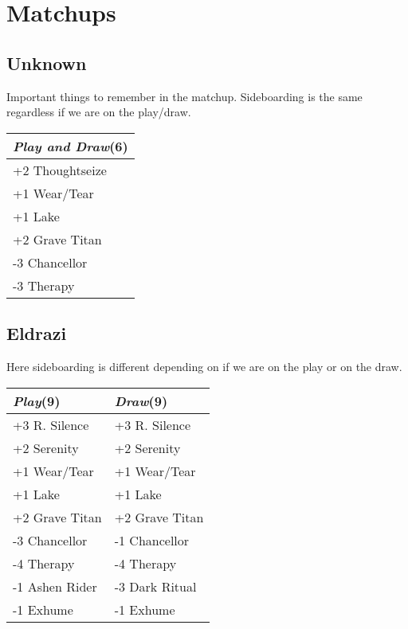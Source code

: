 \documentclass{article}
\renewcommand *\contentsname{Contents}
\begin{document}
\section*{Matchups}
\begin{multicols}{2}
\subsection*{Unknown}
Important things to remember in the matchup. Sideboarding is the same regardless if we are on the play/draw.\begin{center}
\begin{tabular}{| l |}
\hline
\textit{Play and Draw}(6) \\
\hline
\cellcolor[HTML]{BBDDBB}\small{+2 Thoughtseize}\\
\cellcolor[HTML]{BBDDBB}\small{+1 Wear/Tear}\\
\cellcolor[HTML]{BBDDBB}\small{+1 Lake}\\
\cellcolor[HTML]{BBDDBB}\small{+2 Grave Titan}\\
\cellcolor[HTML]{DDBBBB}\small{-3 Chancellor}\\
\cellcolor[HTML]{DDBBBB}\small{-3 Therapy}\\
\hline
\end{tabular}
\end{center}
\subsection*{Eldrazi}
Here sideboarding is different depending on if we are on the play or on the draw.\begin{center}
\begin{tabular}{| l | l |}
\hline
\textit{Play}(9) & \textit{Draw}(9) \\
\hline
\cellcolor[HTML]{BBDDBB}\small{+3 R. Silence} & \cellcolor[HTML]{BBDDBB}\small{+3 R. Silence}\\
\cellcolor[HTML]{BBDDBB}\small{+2 Serenity} & \cellcolor[HTML]{BBDDBB}\small{+2 Serenity}\\
\cellcolor[HTML]{BBDDBB}\small{+1 Wear/Tear} & \cellcolor[HTML]{BBDDBB}\small{+1 Wear/Tear}\\
\cellcolor[HTML]{BBDDBB}\small{+1 Lake} & \cellcolor[HTML]{BBDDBB}\small{+1 Lake}\\
\cellcolor[HTML]{BBDDBB}\small{+2 Grave Titan} & \cellcolor[HTML]{BBDDBB}\small{+2 Grave Titan}\\
\cellcolor[HTML]{DDBBBB}\small{-3 Chancellor} & \cellcolor[HTML]{DDBBBB}\small{-1 Chancellor}\\
\cellcolor[HTML]{DDBBBB}\small{-4 Therapy} & \cellcolor[HTML]{DDBBBB}\small{-4 Therapy}\\
\cellcolor[HTML]{DDBBBB}\small{-1 Ashen Rider} & \cellcolor[HTML]{DDBBBB}\small{-3 Dark Ritual}\\
\cellcolor[HTML]{DDBBBB}\small{-1 Exhume} & \cellcolor[HTML]{DDBBBB}\small{-1 Exhume}\\
\hline
\end{tabular}
\end{center}

\end{multicols}
\end{document}
